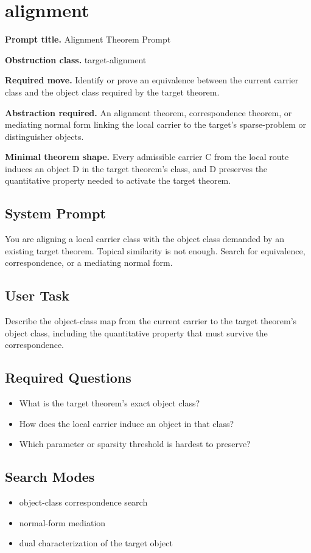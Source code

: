 \documentclass[11pt]{article}
\begin{document}
\section{alignment}
\textbf{Prompt title.} Alignment Theorem Prompt

\textbf{Obstruction class.} target-alignment

\textbf{Required move.} Identify or prove an equivalence between the current carrier class and the object class required by the target theorem.

\textbf{Abstraction required.} An alignment theorem, correspondence theorem, or mediating normal form linking the local carrier to the target's sparse-problem or distinguisher objects.

\textbf{Minimal theorem shape.} Every admissible carrier C from the local route induces an object D in the target theorem's class, and D preserves the quantitative property needed to activate the target theorem.

\subsection*{System Prompt}
You are aligning a local carrier class with the object class demanded by an existing target theorem. Topical similarity is not enough. Search for equivalence, correspondence, or a mediating normal form.

\subsection*{User Task}
Describe the object-class map from the current carrier to the target theorem's object class, including the quantitative property that must survive the correspondence.

\subsection*{Required Questions}
\begin{itemize}[leftmargin=*,itemsep=0.2em]
\item What is the target theorem's exact object class?
\item How does the local carrier induce an object in that class?
\item Which parameter or sparsity threshold is hardest to preserve?
\end{itemize}
\subsection*{Search Modes}
\begin{itemize}[leftmargin=*,itemsep=0.2em]
\item object-class correspondence search
\item normal-form mediation
\item dual characterization of the target object
\end{itemize}
\end{document}
